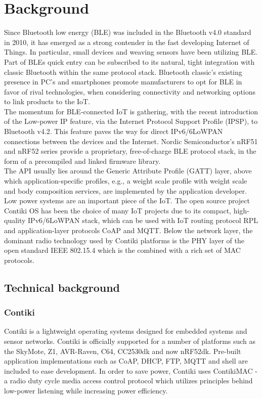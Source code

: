\documentclass{article}
\begin{document}
\tableofcontents
\newpage 

\section{Background}
Since Bluetooth low energy (BLE) was included in the Bluetooth v4.0 standard in 2010, it has emerged as a strong contender in the fast developing Internet of Things. In particular, small devices and weaving sensors have been utilizing BLE. Part of BLEs quick entry can be subscribed to its natural, tight integration with classic Bluetooth within the same protocol stack. Bluetooth classic’s existing presence in PC’s and smartphones promote manufacturers to opt for BLE in favor of rival technologies, when considering connectivity and networking options to link products to the IoT.\\
The momentum for BLE-connected IoT is gathering, with the recent introduction of the Low-power IP feature, via the Internet Protocol Support Profile (IPSP), to Bluetooth v4.2. This feature paves the way for direct IPv6/6LoWPAN connections between the devices and the Internet. Nordic Semiconductor’s nRF51 and nRF52 series provide a proprietary, free-of-charge BLE protocol stack, in the form of a precompiled and linked firmware library.\\
The API usually lies around the Generic Attribute Profile (GATT) layer, above which application-specific profiles, e.g., a weight scale profile with weight scale and body composition services, are implemented by the application developer.\\
Low power systems are an important piece of the IoT. The open source project Contiki OS has been the choice of many IoT projects due to its compact, high-quality IPv6/6LoWPAN stack, which can be used with IoT routing protocol RPL and application-layer protocols CoAP and MQTT. Below the network layer, the dominant radio technology used by Contiki platforms is the PHY layer of the open standard IEEE 802.15.4 which is the combined with a rich set of MAC protocols.\\
\subsection{Technical background}
\subsubsection{Contiki}
Contiki is a lightweight operating systems designed for embedded systems and sensor networks. Contiki is officially supported for a number of platforms such as the SkyMote, Z1, AVR-Raven, C64, CC2530dk and now nRF52dk. Pre-built application implementations such as CoAP, DHCP, FTP, MQTT and shell are included to ease development.
In order to save power, Contiki uses ContikiMAC - a radio duty cycle media access control protocol which utilizes principles behind low-power listening while increasing power efficiency.
\end{document}
